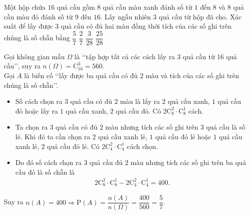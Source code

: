 \begin{ex}%
	Một hộp chứa $16$ quả cầu gồm $8$ quả cầu màu xanh đánh số từ $1$ đến $8$ và $8$ quả cầu màu đỏ đánh số từ $9$ đến $16$. Lấy ngẫu nhiên $3$ quả cầu từ hộp đã cho. Xác suất để lấy được $3$ quả cầu có đủ hai màu đồng thời tích của các số ghi trên chúng là số chẵn bằng
	\choice
	{\True $\dfrac{5}{7}$}
	{$\dfrac{2}{7}$}
	{$\dfrac{3}{28}$}
	{$\dfrac{25}{28}$}
	\loigiai
	{
		Gọi không gian mẫu $\Omega$ là \lq\lq tập hợp tất cả các cách lấy ra $3$ quả cầu từ $16$ quả cầu\rq\rq, suy ra $n\left(\Omega\right)=\mathrm{C}_{16}^3=560$.\\
		Gọi $A$ là biến cố \lq\lq lấy được ba quả cầu có đủ $2$ màu và tích của các số ghi trên chúng là số chẵn\rq\rq. 
		\begin{itemize}
			\item Số cách chọn ra $3$ quả cầu có đủ $2$ màu là lấy ra $2$ quả cầu xanh, $1$ quả cầu đỏ hoặc lấy ra $1$ quả cầu xanh, $2$ quả cầu đỏ. Có $2\mathrm{C}_{8}^2\cdot \mathrm{C}_{8}^1$  cách.
			\item Ta chọn ra $3$ quả cầu có đủ $2$ màu nhưng tích các số ghi trên $3$ quả cầu là số lẻ. Khi đó ta cần chọn ra $2$ quả cầu xanh lẻ, $1$ quả cầu đỏ lẻ hoặc $1$ quả cầu xanh lẻ, $2$ quả cầu đỏ lẻ. Có $2\mathrm{C}_4^2\cdot \mathrm{C}_{4}^1$ cách chọn.
			\item Do đó số cách chọn ra $3$ quả cầu đủ $2$ màu nhưng tích các số ghi trên ba quả cầu đó là số chẵn là
			\begin{align*}
				2\mathrm{C}_{8}^2\cdot \mathrm{C}_{8}^1-2\mathrm{C}_{4}^2\cdot \mathrm{C}_{4}^1=400.
			\end{align*}
		\end{itemize}
		Suy ra $n\left(A\right)=400\Rightarrow \mathrm{P}(A)=\dfrac{n(A)}{n\left(\Omega\right)}=\dfrac{400}{560}=\dfrac{5}{7}$.
	}
\end{ex}

